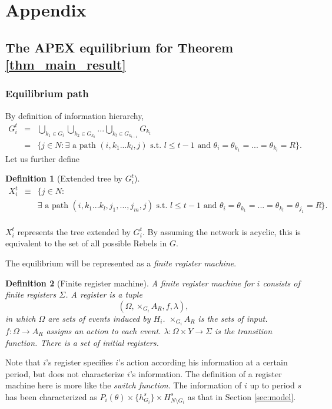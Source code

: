 \documentclass[12pt,letter]{article}
\newtheorem{definition}{Definition}[section]
\theoremstyle{definition}
\theoremstyle{remark}
\theoremstyle{claim}
\begin{document}


\appendix
\section{Appendix}
\subsection{The APEX equilibrium for Theorem \ref{thm_main_result}}
\subsubsection{Equilibrium path}
By definition of information hierarchy, 
\begin{eqnarray*}
G^t_i & = & \bigcup_{k_1\in G_i}\bigcup_{k_2\in G_{k_0}}...\bigcup_{k_{t}\in G_{k_{t-1}}}G_{k_{t}}\\
&= & \{j\in N: \text{$\exists$ a path $(i,k_1...k_{l},j)$ s.t.~$l\leq t-1$ and $\theta_i=\theta_{k_1}=...=\theta_{k_l}=R$}\}.
\end{eqnarray*}
Let us further define
\begin{definition}[Extended tree by $G^t_i$]
\label{def:ext_tree}
\begin{eqnarray*}
X^t_i & \equiv &  \{j\in N: \\
	& & \text{$\exists$ a path $(i,k_1...k_{l},j_1,...,j_m,j)$ s.t.~$l\leq t-1$ and $\theta_i=\theta_{k_1}=...=\theta_{k_l}=\theta_{j_1}=R$}\}.\\
\end{eqnarray*}
\end{definition}
$X^t_i $ represents the tree extended by $G^t_i$. By assuming the network is acyclic, this is equivalent to the set of all possible Rebels in $G$. 

The equilibrium will be represented as a \textit{finite register machine}. 
\begin{definition}[Finite register machine]
A finite register machine for $i$ consists of finite registers $\Sigma$. A register is a tuple \[(\Omega, \times_{G_i}A_R,f,\lambda),\] in which $\Omega$ are sets of events induced by $H_i$. $\times_{G_i}A_R$ is the sets of input. $f:\Omega\rightarrow A_{R}$ assigns an action to each event. $\lambda: \Omega\times Y \rightarrow \Sigma$ is the transition function. There is a set of initial registers. 
\end{definition}

Note that $i$'s register specifies $i$'s action according his information at a certain period, but does not characterize $i$'s information. The definition of a register machine here is more like the \textit{switch function}. The information of $i$ up to period $s$ has been characterized as $P_i(\theta)\times \{h^s_{G_i}\}\times H^s_{N\setminus G_i}$ as that in Section \ref{sec:model}. 
\end{document}
